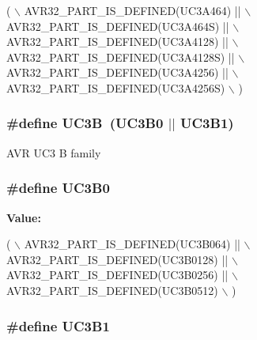\begin{DoxyCode}
(       \(\backslash\)
                AVR32\_PART\_IS\_DEFINED(UC3A464)   || \(\backslash\)
                AVR32\_PART\_IS\_DEFINED(UC3A464S)  || \(\backslash\)
                AVR32\_PART\_IS\_DEFINED(UC3A4128)  || \(\backslash\)
                AVR32\_PART\_IS\_DEFINED(UC3A4128S) || \(\backslash\)
                AVR32\_PART\_IS\_DEFINED(UC3A4256)  || \(\backslash\)
                AVR32\_PART\_IS\_DEFINED(UC3A4256S) \(\backslash\)
                )
\end{DoxyCode}
\hypertarget{group__uc3__part__macros__group_ga61e51606324c212eb11079e5acf592e0}{
\subsubsection[{U\-C3\-B}]{\setlength{\rightskip}{0pt plus 5cm}\#define U\-C3\-B~(U\-C3\-B0 $|$$|$ U\-C3\-B1)}}\label{group__uc3__part__macros__group_ga61e51606324c212eb11079e5acf592e0}
A\-V\-R U\-C3 B family \hypertarget{group__uc3__part__macros__group_ga701194230718f73a89efc39742e061af}{
\subsubsection[{U\-C3\-B0}]{\setlength{\rightskip}{0pt plus 5cm}\#define U\-C3\-B0}}\label{group__uc3__part__macros__group_ga701194230718f73a89efc39742e061af}
{\bfseries Value\-:}
\begin{DoxyCode}
(       \(\backslash\)
                AVR32\_PART\_IS\_DEFINED(UC3B064)  || \(\backslash\)
                AVR32\_PART\_IS\_DEFINED(UC3B0128) || \(\backslash\)
                AVR32\_PART\_IS\_DEFINED(UC3B0256) || \(\backslash\)
                AVR32\_PART\_IS\_DEFINED(UC3B0512) \(\backslash\)
                )
\end{DoxyCode}
\hypertarget{group__uc3__part__macros__group_ga96602eec1c923afe92a64d807a242cd7}{
\subsubsection[{U\-C3\-B1}]{\setlength{\rightskip}{0pt plus 5cm}\#define U\-C3\-B1}}\label{group__uc3__part__macros__group_ga96602eec1c923afe92a64d807a242cd7}
